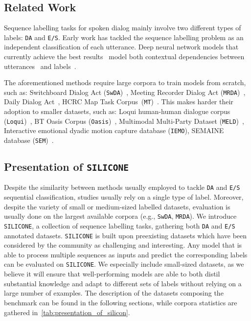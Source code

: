 \documentclass[11pt,a4paper]{article}
\begin{document}
\subsection{Related Work}
Sequence labelling tasks for spoken dialog mainly involve two different types of labels: \texttt{DA} and \texttt{E/S}. Early work has tackled the sequence labelling problem as an independent classification of each utterance. Deep neural network models that currently achieve the best results~\cite{bayesian_dialog,svm_dialog,hmm_dialog} model both contextual dependencies between utterances~\cite{colombo2020guiding,concurrent_mrda} and labels~\cite{crf_chen,crf_kumar,crf_li}.

The aforementioned methods require large corpora to train models from scratch, such as: Switchboard Dialog Act (\texttt{SwDA})~\cite{datase_swda},  Meeting Recorder Dialog Act (\texttt{MRDA})~\cite{dataset_mrda}, Daily Dialog Act~\cite{dataset_dailydialog}, HCRC Map Task Corpus~(\texttt{MT})~\cite{dataset_maptask}.
This makes harder their adoption to smaller datasets, such as: Loqui human-human dialogue corpus (\texttt{Loqui})~\cite{dataset_loquihuman}, BT Oasis Corpus (\texttt{Oasis})~\cite{dataset_gtoasis}, Multimodal Multi-Party Dataset (\texttt{MELD})~\cite{dataset_meld}, Interactive emotional dyadic motion capture database (\texttt{IEMO}), SEMAINE database (\texttt{SEM})~\cite{dataset_semaine}. 

\subsection{Presentation of \texttt{SILICONE}}
Despite the similarity between methods usually employed to tackle \texttt{DA} and \texttt{E/S} sequential classification, studies usually rely on a single type of label. Moreover, despite the variety of small or medium-sized labelled datasets, evaluation is usually done on the largest available corpora (e.g., \texttt{SwDA}, \texttt{MRDA}).
We introduce \texttt{SILICONE}, a collection of sequence labelling tasks, gathering both \texttt{DA} and \texttt{E/S} annotated datasets. \texttt{SILICONE} is built upon preexisting datasets which have been considered by the community as challenging and interesting.
Any model that is able to process multiple sequences as inputs and predict the corresponding labels can be evaluated on \texttt{SILICONE}. We especially include small-sized datasets, as we believe it will ensure that well-performing models are able to both distil substantial knowledge and adapt to different sets of labels without relying on a large number of examples.
The description of the datasets composing the benchmark can be found in the following sections, while corpora statistics are gathered in~\autoref{tab:presentation_of_silicon}.
\end{document}
